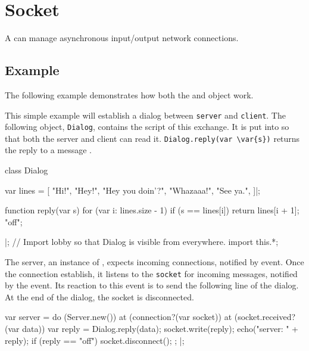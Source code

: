
\section{Socket}

A  can manage asynchronous input/output network connections.

\subsection{Example}

The following example demonstrates how both the  and
 object work.

This simple example will establish a dialog between \lstinline|server| and
\lstinline|client|.  The following object, \lstinline|Dialog|, contains the
script of this exchange.  It is put into  so that both the
server and client can read it.  \lstinline|Dialog.reply(var \var{s})|
returns the reply to a message .

\begin{urbiscript}
class Dialog
{
  var lines =
  [
    "Hi!",
    "Hey!",
    "Hey you doin'?",
    "Whazaaa!",
    "See ya.",
  ]|;

  function reply(var s)
  {
    for (var i: lines.size - 1)
      if (s == lines[i])
        return lines[i + 1];
    "off";
  }
}|;
// Import lobby so that Dialog is visible from everywhere.
import this.*;
\end{urbiscript}

The server, an instance of , expects incoming connections,
notified by  event.  Once the connection
establish, it listens to the \lstinline|socket| for incoming messages,
notified by the  event.  Its reaction to this event is to
send the following line of the dialog.  At the end of the dialog, the socket
is disconnected.

\begin{urbiscript}
var server =
  do (Server.new())
  {
    at (connection?(var socket))
      at (socket.received?(var data))
      {
        var reply = Dialog.reply(data);
        socket.write(reply);
        echo("server: " + reply);
        if (reply == "off")
          socket.disconnect();
      };
  }|;
\end{urbiscript}

